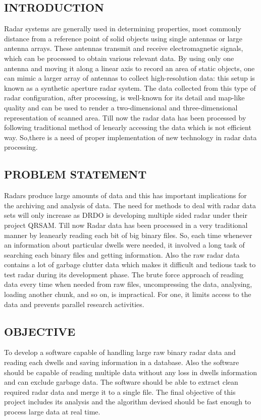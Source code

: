 \documentclass[14pt]{article} %
\begin{document}
\subsection{INTRODUCTION}
         Radar systems are generally used in determining properties, most commonly distance from a reference point of solid objects using single antennas or large antenna arrays. These antennas transmit and receive electromagnetic signals, which can be processed to obtain various relevant data. By using only one antenna and moving it along a linear axis to record an area of static objects, one can mimic a larger array of antennas to collect high-resolution data: this setup is known as a synthetic aperture radar system. The data collected from this type of radar configuration, after processing, is well-known for its detail and map-like quality and can be used to render a two-dimensional and three-dimensional representation of scanned area.
         Till now the radar data has been processed by following traditional method of lenearly accessing the data which is not efficient way. So,there is a need of proper implementation of new technology in radar data processing.

\subsection{PROBLEM STATEMENT}
           Radars produce large amounts of data and this has important implications for the archiving and analysis of data. The need for methods to deal with radar data sets will only increase as DRDO is developing multiple sided radar under their project QRSAM. Till now Radar data has been processed in a very traditional manner by leanearly reading each bit of big binary files. So, each time whenever an information about particular dwells were needed, it involved a long task of searching each binary files and getting information. Also the raw radar data contains a lot of garbage clutter data which makes it difficult and tedious task to test radar during its development phase. The brute force approach of reading data every time when needed from raw files, uncompressing the data, analysing, loading another chunk, and so on, is impractical. For one, it limits access to the data and prevents parallel research activities.

\subsection{OBJECTIVE}
 To develop a software capable of handling large raw binary radar data and reading each dwells and saving information in a database. Also the software should be capable of reading multiple data without any loss in dwells information and can exclude garbage data. The software should be able to extract clean required radar data and merge it to a single file. The final objective of this project includes its analysis and the algorithm devised should be fast enough to process large data at real time. 
\end{document}

